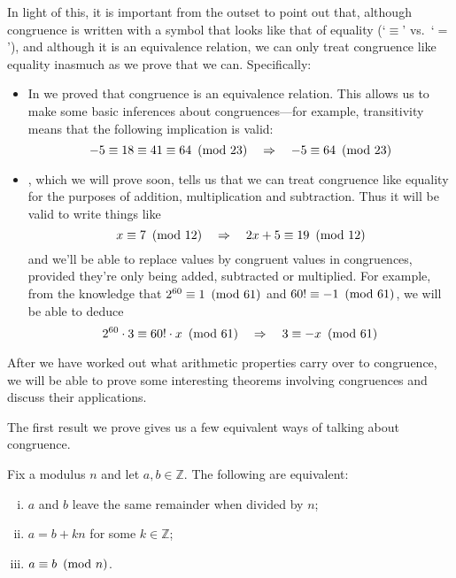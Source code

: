 In light of this, it is important from the outset to point out that, although congruence is written with a symbol that looks like that of equality (`$\equiv$' vs.\ `$=$'), and although it is an equivalence relation, we can only treat congruence like equality inasmuch as we prove that we can. Specifically:
\begin{itemize}
\item In  we proved that congruence is an equivalence relation. This allows us to make some basic inferences about congruences---for example, transitivity means that the following implication is valid:
\[ -5 \equiv 18 \equiv 41 \equiv 64 ~\left(\text{mod}~23\right) \quad \Rightarrow \quad -5 \equiv 64 ~\left(\text{mod}~23\right) \]
\item {}, which we will prove soon, tells us that we can treat congruence like equality for the purposes of addition, multiplication and subtraction. Thus it will be valid to write things like
\[ x \equiv 7 ~\left(\text{mod}~12\right) \quad \Rightarrow \quad 2x+5 \equiv 19 ~\left(\text{mod}~12\right) \]
and we'll be able to replace values by congruent values in congruences, provided they're only being added, subtracted or multiplied. For example, from the knowledge that $2^{60} \equiv 1 ~\left(\text{mod}~61\right)$ and $60! \equiv -1 ~\left(\text{mod}~61\right)$, we will be able to deduce
\[ 2^{60} \cdot 3 \equiv 60! \cdot x ~\left(\text{mod}~61\right) \quad \Rightarrow \quad 3 \equiv -x ~\left(\text{mod}~61\right) \]
\end{itemize}

After we have worked out what arithmetic properties carry over to congruence, we will be able to prove some interesting theorems involving congruences and discuss their applications.

The first result we prove gives us a few equivalent ways of talking about congruence.

\begin{proposition}
\label{propModAsDivDiff}
Fix a modulus $n$ and let $a,b \in \mathbb{Z}$. The following are equivalent:
\begin{enumerate}[(i)]
\item $a$ and $b$ leave the same remainder when divided by $n$;
\item $a=b+kn$ for some $k \in \mathbb{Z}$;
\item $a \equiv b ~\left(\text{mod}~n\right)$.
\end{enumerate}
\end{proposition}


